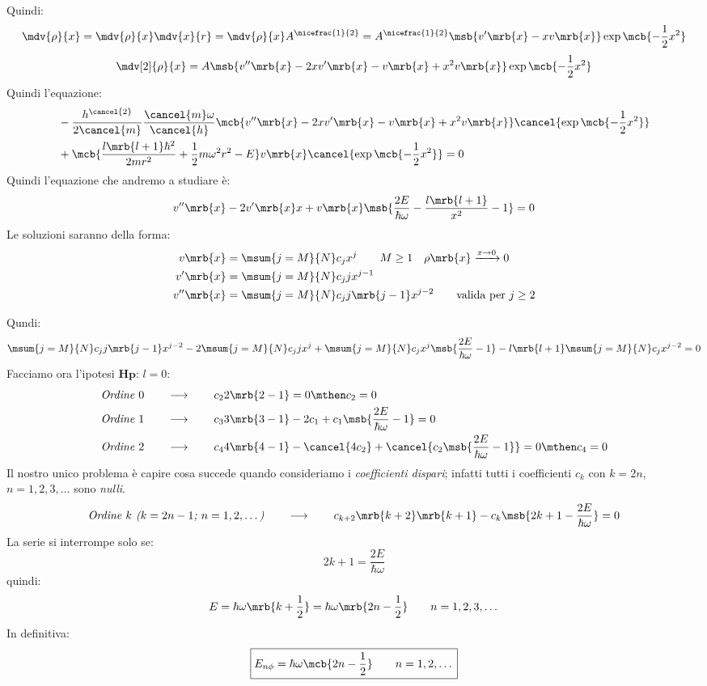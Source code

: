 Quindi:
\[
  \mdv{\rho}{x} = \mdv{\rho}{x} \mdv{x}{r} = \mdv{\rho}{x} A ^{\nicefrac{1}{2}}
  = A ^{\nicefrac{1}{2}} \msb{v' \mrb{x} - x v \mrb{x}} \exp\mcb{- \frac{1}{2}
  x^2}
\]
\[
  \mdv[2]{\rho}{x} = A \msb{v'' \mrb{x} - 2 x v' \mrb{x} - v \mrb{x} + x^2 v
  \mrb{x}} \exp\mcb{- \frac{1}{2} x^2}
\]
Quindi l'equazione:
\begin{align*}
  & - \frac{h^{\cancel{2}}}{2\cancel{m}} \frac{\cancel{m} \omega}{\cancel{h}}
  \mcb{v'' \mrb{x} - 2 x v' \mrb{x} - v \mrb{x} + x^2 v \mrb{x}}
  \cancel{\exp\mcb{- \frac{1}{2} x^2}}
  \\
  & + \mcb{\frac{l \mrb{l + 1} \hbar^2}{2 m
  r^2} + \frac{1}{2} m \omega^2 r^2 - E} v \mrb{x}
  \cancel{\exp\mcb{-\frac{1}{2} x^2}} = 0
\end{align*}
Quindi l'equazione che andremo a studiare è:
\[
  v'' \mrb{x}  - 2 v' \mrb{x} x + v \mrb{x} \msb{\frac{2E}{\hbar \omega} -
  \frac{l \mrb{l + 1}}{x^2} - 1} = 0
\]
Le soluzioni saranno della forma:
\begin{align*}
  v \mrb{x} &= \msum{j=M}{N} c_j x^j
  \qquad
  M \geq 1
  \quad
  \rho \mrb{x} \xrightarrow{x \to 0} 0
  \\
  v' \mrb{x} &= \msum{j=M}{N} c_j j x ^{j-1}
  \\
  v'' \mrb{x} &= \msum{j=M}{N} c_j j \mrb{j - 1} x ^{j - 2}
  \qquad
  \text{valida per } j \geq 2
\end{align*}

Qundi:
\[
  \msum{j=M}{N} c_j j \mrb{j - 1} x ^{j-2} - 2 \msum{j=M}{N} c_j j x ^{j} +
  \msum{j=M}{N} c_j x^j \msb{\frac{2E}{\hbar \omega} - 1} - l \mrb{l + 1}
  \msum{j=M}{N} c_j x ^{j-2} = 0
\]
Facciamo ora l'ipotesi $\textbf{Hp: } l = 0$:
\begin{align*}
  &\textit{Ordine $0$} \qquad\longrightarrow\qquad c_2 2 \mrb{2 - 1} = 0 \mthen
  c_2 = 0
  \\
  &\textit{Ordine $1$} \qquad\longrightarrow\qquad c_3 3 \mrb{3 - 1} - 2 c_1 +
  c_1 \msb{\frac{2E}{\hbar \omega} - 1} = 0
  \\
  &\textit{Ordine $2$} \qquad\longrightarrow\qquad c_4 4 \mrb{4 - 1} -
  \cancel{4 c_2} + \cancel{c_2 \msb{\frac{2E}{\hbar \omega} - 1}} = 0
  \mthen c_4 = 0
\end{align*}
Il nostro unico problema è capire cosa succede quando consideriamo i
\textit{coefficienti dispari}; infatti tutti i coefficienti $c_k$ con $k = 2n$,
$n = 1, 2, 3, \dots$ sono \textit{nulli}.
\begin{align*}
  \textit{Ordine $k$ ($k = 2n - 1$; $n = 1, 2, \dots$)}
  \qquad\longrightarrow\qquad
  c _{k+2} \mrb{k+2}\mrb{k+1} - c_k \msb{2k + 1 - \frac{2E}{\hbar \omega}} = 0
\end{align*}
La serie si interrompe solo se:
\[
  2k + 1 = \frac{2E}{\hbar \omega}
\]
quindi:
\[
  E = \hbar \omega \mrb{k + \frac{1}{2}} = \hbar \omega \mrb{2n - \frac{1}{2}}
  \qquad n = 1, 2, 3, \dots
\]
In definitiva:
\[
  \boxed{
    E _{n \phi} = \hbar \omega \mcb{2n - \frac{1}{2}}
    \qquad
    n = 1, 2, \dots
  }
\]

